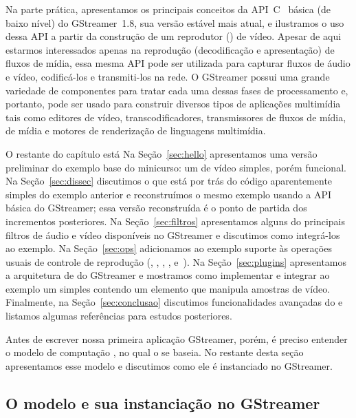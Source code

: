 \documentclass{SBCbookchapter}
\begin{document}
Na parte prática, apresentamos os principais conceitos da
API~C~\cite{Kernighan-B-W-1988} básica (de baixo nível) do GStreamer~1.8,
sua versão estável mais atual, e ilustramos o uso dessa API a partir da
construção de um reprodutor () de vídeo.  Apesar de aqui estarmos
interessados apenas na reprodução (decodificação e apresentação) de fluxos
de mídia, essa mesma API pode ser utilizada para capturar fluxos de áudio e
vídeo, codificá-los e transmiti-los na rede.  O GStreamer possui uma grande
variedade de componentes para tratar cada uma dessas fases de processamento
e, portanto, pode ser usado para construir diversos tipos de aplicações
multimídia tais como editores de vídeo, transcodificadores, transmissores de
fluxos de mídia,  de mídia e motores de renderização de
linguagens multimídia.

O restante do capítulo está Na Seção~\ref{sec:hello} apresentamos uma versão
preliminar do exemplo base do minicurso: um  de vídeo simples,
porém funcional.  Na Seção~\ref{sec:dissec} discutimos o que está por trás
do código aparentemente simples do exemplo anterior e reconstruímos o mesmo
exemplo usando a API básica do GStreamer; essa versão reconstruída é o ponto
de partida dos incrementos posteriores.  Na Seção~\ref{sec:filtros}
apresentamos alguns do principais filtros de áudio e vídeo disponíveis no
GStreamer e discutimos como integrá-los ao exemplo.  Na Seção~\ref{sec:ops}
adicionamos ao exemplo suporte às operações usuais de controle de reprodução
(, , , , 
e~).  Na Seção~\ref{sec:plugins} apresentamos a arquitetura de
 do GStreamer e mostramos como implementar e integrar ao exemplo
um  simples contendo um elemento que manipula amostras de vídeo.
Finalmente, na Seção~\ref{sec:conclusao} discutimos funcionalidades
avançadas do  e listamos algumas referências para estudos
posteriores.

Antes de escrever nossa primeira aplicação GStreamer, porém, é preciso
entender o modelo de computação , no qual o  se
baseia.  No restante desta seção apresentamos esse modelo e discutimos como
ele é instanciado no GStreamer.


\clearpage
\subsection*{O modelo  e sua instanciação no GStreamer}
\end{document}
